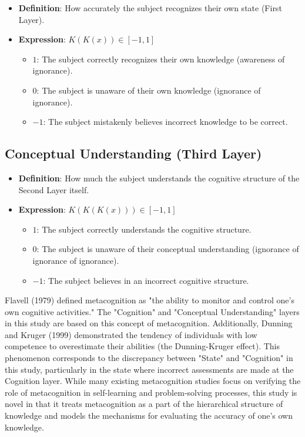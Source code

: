 \documentclass{article}
\begin{document}
\begin{itemize}
    \item \textbf{Definition}: How accurately the subject recognizes their own state (First Layer).
    \item \textbf{Expression}: \( K(K(x)) \in [-1, 1] \)
        \begin{itemize}
            \item \( 1 \): The subject correctly recognizes their own knowledge (awareness of ignorance).
            \item \( 0 \): The subject is unaware of their own knowledge (ignorance of ignorance).
            \item \(-1 \): The subject mistakenly believes incorrect knowledge to be correct.
        \end{itemize}
\end{itemize}

\subsection{Conceptual Understanding (Third Layer)}

\begin{itemize}
    \item \textbf{Definition}: How much the subject understands the cognitive structure of the Second Layer itself.
    \item \textbf{Expression}: \( K(K(K(x))) \in [-1, 1] \)
        \begin{itemize}
            \item \( 1 \): The subject correctly understands the cognitive structure.
            \item \( 0 \): The subject is unaware of their conceptual understanding (ignorance of ignorance of ignorance).
            \item \(-1 \): The subject believes in an incorrect cognitive structure.
        \end{itemize}
\end{itemize}

Flavell (1979) defined metacognition as "the ability to monitor and control one's own cognitive activities." The "Cognition" and "Conceptual Understanding" layers in this study are based on this concept of metacognition. Additionally, Dunning and Kruger (1999) demonstrated the tendency of individuals with low competence to overestimate their abilities (the Dunning-Kruger effect). This phenomenon corresponds to the discrepancy between "State" and "Cognition" in this study, particularly in the state where incorrect assessments are made at the Cognition layer. While many existing metacognition studies focus on verifying the role of metacognition in self-learning and problem-solving processes, this study is novel in that it treats metacognition as a part of the hierarchical structure of knowledge and models the mechanisms for evaluating the accuracy of one's own knowledge.
\end{document}
